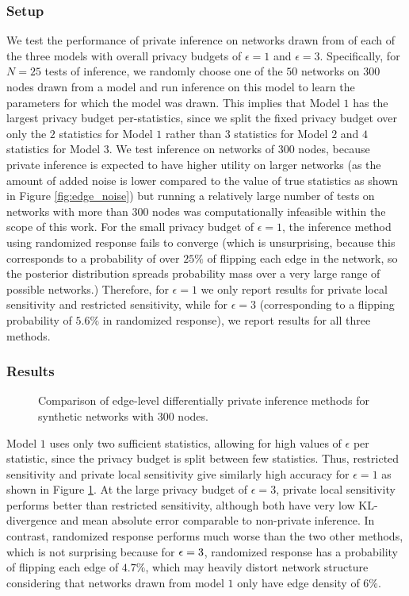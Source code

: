  \subsubsection{Setup}
 
 We test the performance of private inference on networks drawn from of each of the three models with overall privacy budgets of $\epsilon=1$ and $\epsilon=3$. Specifically, for $N=25$ tests of inference, we randomly choose one of the $50$ networks on $300$ nodes drawn from a model and run inference on this model to learn the parameters for which the model was drawn. This implies that Model $1$ has the largest privacy budget per-statistics, since we split the fixed privacy budget over only the $2$ statistics for Model $1$ rather than $3$ statistics for Model $2$ and $4$ statistics for Model $3$. We test inference on networks of $300$ nodes, because private inference is expected to have higher utility on larger networks (as the amount of added noise is lower compared to the value of true statistics as shown in Figure \ref{fig:edge_noise}) but running a relatively large number of tests on networks with more than $300$ nodes was computationally infeasible within the scope of this work. For the small privacy budget of $\epsilon=1$, the inference method using randomized response fails to converge (which is unsurprising, because this corresponds to a probability of over $25\%$ of flipping each edge in the network, so the posterior distribution spreads probability mass over a very large range of possible networks.) Therefore, for $\epsilon=1$ we only report results for private local sensitivity and restricted sensitivity, while for $\epsilon = 3$ (corresponding to a flipping probability of $5.6\%$ in randomized response), we report results for all three methods.
 
 \subsubsection{Results}
  
 \begin{figure}[hp]
 	\caption{Comparison of edge-level differentially private inference methods for synthetic networks with $300$ nodes.} 
 	\centering
 	
 	\label{fig:edgeinfsynth}
 \end{figure}
 
Model $1$ uses only two sufficient statistics, allowing for high values of $\epsilon$ per statistic, since the privacy budget is split between few statistics. Thus, restricted sensitivity and private local sensitivity give similarly high accuracy for $\epsilon=1$ as shown in Figure \ref{fig:edgeinfsynth}. At the large privacy budget of $\epsilon=3$, private local sensitivity performs better than restricted sensitivity, although both have very low KL-divergence and mean absolute error comparable to non-private inference. In contrast, randomized response performs much worse than the two other methods, which is not surprising because for $\epsilon = 3$, randomized response has a probability of flipping each edge of $4.7\%$, which may heavily distort network structure considering that networks drawn from model $1$ only have edge density of $6\%$.

